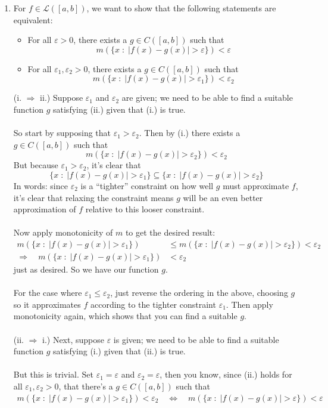 \documentclass[12pt]{article}
\theoremstyle{plain}
\theoremstyle{definition}
\theoremstyle{remark}
\begin{document}
\begin{enumerate}
\begin{enumerate}
\end{enumerate} 

\newpage
\item For $f\in\mathscr{L}([a,b])$, we want to show that the following statements are equivalent:
\begin{itemize}
\item[i.] For all $\varepsilon>0$, there exists a $g\in C([a,b])$ such that \[
    m(\{x\;:\; |f(x) - g(x)|>\varepsilon\}) < \varepsilon
\]
\item[ii.] For all $\varepsilon_1,\varepsilon_2 >0$, there exists a $g\in C([a,b])$ such that \[
    m(\{x\;:\; |f(x) - g(x)|>\varepsilon_1\}) < 
    \varepsilon_2
\]
\end{itemize}
(i. $\Rightarrow$ ii.) Suppose $\varepsilon_1$ and $\varepsilon_2$ are given; we need to be able to find a suitable function $g$ satisfying (ii.) given that (i.) is true.
\\
\\
So start by supposing that $\varepsilon_1 > \varepsilon_2$. Then by (i.) there exists a $g\in C([a,b])$ such that
\[
    m(\{x\;:\; |f(x) - g(x)|>\varepsilon_2\}) < \varepsilon_2
\]
But because $\varepsilon_1 >\varepsilon_2$, it's clear that 
\[
    \{x\;:\; |f(x) - g(x)|>\varepsilon_1\} \subseteq
    \{x\;:\; |f(x) - g(x)|>\varepsilon_2\}
\]
In words: since $\varepsilon_2$ is a ``tighter'' constraint on how well $g$ must approximate $f$, it's clear that relaxing the constraint means $g$ will be an even better approximation of $f$ relative to this looser constraint.
\\
\\
Now apply monotonicity of $m$ to get the desired result:
\begin{align*}
    m(\{x\;:\; |f(x) - g(x)|>\varepsilon_1\}) &\leq
    m(\{x\;:\; |f(x) - g(x)|>\varepsilon_2\}) < 
    \varepsilon_2 \\
    \Rightarrow \quad
    m(\{x\;:\; |f(x) - g(x)|>\varepsilon_1\}) &<
    \varepsilon_2 
\end{align*}
just as desired. So we have our function $g$.
\\
\\
For the case where $\varepsilon_1 \leq \varepsilon_2$, just reverse the ordering in the above, choosing $g$ so it approximates $f$ according to the tighter constraint $\varepsilon_1$. Then apply monotonicity again, which shows that you can find a suitable $g$.
\\
\\
(ii. $\Rightarrow$ i.) Next, suppose $\varepsilon$ is given; we need to be able to find a suitable function $g$ satisfying (i.) given that (ii.) is true.
\\
\\
But this is trivial. Set $\varepsilon_1 = \varepsilon$ and $\varepsilon_2 = \varepsilon$, then you know, since (ii.) holds for all $\varepsilon_1,\varepsilon_2>0$, that there's a $g\in C([a,b])$ such that
\begin{align*}
    m(\{x\;:\; |f(x) - g(x)|>\varepsilon_1\}) < 
    \varepsilon_2
    \quad \Leftrightarrow \quad
    m(\{x\;:\; |f(x) - g(x)|>\varepsilon\}) < 
    \varepsilon
\end{align*}


\end{enumerate}
\end{document}
